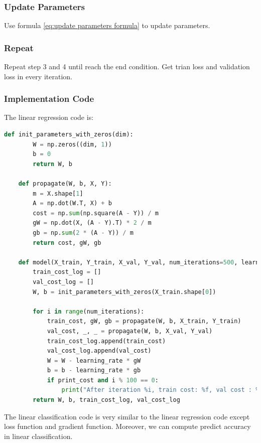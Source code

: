 \documentclass[journal, a4paper]{IEEEtran}
\begin{document}
\subsubsection{Update Parameters} \label{update parameters}
Use formula \eqref{eq:update parameters formula} to update parameters.
\subsubsection{Repeat}
Repeat step 3 and 4 until reach the end condition. Get trian loss and validation loss in every iteration.
\\

\subsubsection{Implementation Code}
The linear regression code is:

\begin{lstlisting}[language=Python]
    def init_parameters_with_zeros(dim):
        W = np.zeros((dim, 1))
        b = 0
        return W, b

    def propagate(W, b, X, Y):
        m = X.shape[1]
        A = np.dot(W.T, X) + b
        cost = np.sum(np.square(A - Y)) / m
        gW = np.dot(X, (A - Y).T) * 2 / m
        gb = np.sum(2 * (A - Y)) / m
        return cost, gW, gb

    def model(X_train, Y_train, X_val, Y_val, num_iterations=500, learning_rate=0.01, print_cost=False):
        train_cost_log = []
        val_cost_log = []
        W, b = init_parameters_with_zeros(X_train.shape[0])
    
        for i in range(num_iterations):
            train_cost, gW, gb = propagate(W, b, X_train, Y_train)
            val_cost, _, _ = propagate(W, b, X_val, Y_val)
            train_cost_log.append(train_cost)
            val_cost_log.append(val_cost)
            W = W - learning_rate * gW
            b = b - learning_rate * gb
            if print_cost and i % 100 == 0:
                print("After iteration %i, train cost: %f, val cost : %f" %(i, train_cost, val_cost))
        return W, b, train_cost_log, val_cost_log
\end{lstlisting}

The linear classification code is very similar to the linear regression code except loss function and gradient function.
Moreover, we can compute predict accuracy in linear classification.
\end{document}
